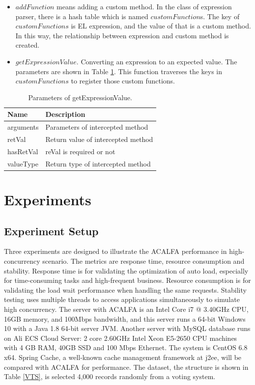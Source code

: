 \documentclass{singlecol-new}
\theoremstyle{TH}{
\newtheorem{lemma}{Lemma}
\newtheorem{theorem}[lemma]{Theorem}
\newtheorem{corrolary}[lemma]{Corrolary}
\newtheorem{conjecture}[lemma]{Conjecture}
\newtheorem{proposition}[lemma]{Proposition}
\newtheorem{claim}[lemma]{Claim}
\newtheorem{stheorem}[lemma]{Wrong Theorem}
}
\theoremstyle{THrm}{
\newtheorem{definition}{Definition}[section]
\newtheorem{question}{Question}[section]
\newtheorem{remark}{Remark}
\newtheorem{scheme}{Scheme}
}
\theoremstyle{THhit}{
\newtheorem{case}{Case}[section]
}
\begin{document}
\begin{itemize}
  \item $addFunction$ means adding a custom method. In the class of expression parser, there is a hash table which is named $customFunction$s. The key of $customFunctions$ is EL expression, and the value of that is a custom method. In this way, the relationship between expression and custom method is created.
  \item $getExpressionValue$. Converting an expression to an expected value. The parameters are shown in Table \ref{getExpressionValue}. This function traverses the keys in $customFunctions$ to register those custom functions.
\end{itemize}

\begin{table}[htb]
\begin{center}
 \caption{\label{getExpressionValue}Parameters of getExpressionValue.}
 \begin{tabular}{ll}
 \toprule
Name & Description\\
 \midrule
arguments & Parameters of intercepted method\\
retVal & Return value of intercepted method\\
hasRetVal & reVal is required or not\\
valueType & Return type of intercepted method\\
\bottomrule
 \end{tabular}
\end{center}
\end{table}

\section{Experiments}
\label{Experiments}

\subsection{Experiment Setup}
Three experiments are designed to illustrate the ACALFA performance in high-concurrency scenario. The metrics are response time, resource consumption and stability. Response time is for validating the optimization of auto load, especially for time-consuming tasks and high-frequent business. Resource consumption is for validating the load wait performance when handling the same requests. Stability testing uses multiple threads to access applications simultaneously to simulate high concurrency. The server with ACALFA is an Intel Core i7 @ 3.40GHz CPU, 16GB memory, and 100Mbps bandwidth, and this server runs a 64-bit Windows 10 with a Java 1.8 64-bit server JVM. Another server with MySQL database runs on Ali ECS Cloud Server: 2 core 2.60GHz Intel Xeon E5-2650 CPU machines with 4 GB RAM, 40GB SSD and 100 Mbps Ethernet. The system is CentOS 6.8 x64. Spring Cache, a well-known cache management framework at j2ee, will be compared with ACALFA for performance. The dataset, the structure is shown in Table \ref{VTS}, is selected 4,000 records randomly from a voting system.
\end{document}
